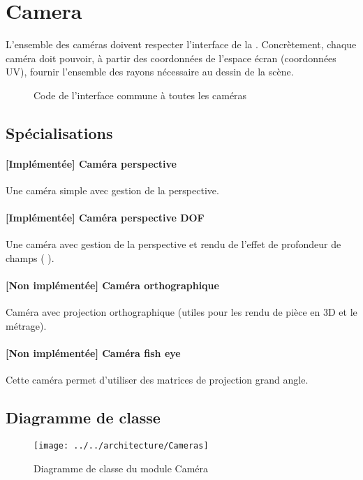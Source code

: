 \section{Camera}
L'ensemble des caméras doivent respecter l'interface de la . Concrètement, chaque caméra doit pouvoir, à partir des
coordonnées de l'espace écran (coordonnées UV), fournir l'ensemble des rayons
nécessaire au dessin de la scène.

\begin{figure}[h]
  \caption{Code de l'interface commune à toutes les
  caméras\label{fig:ICamera}}
\end{figure}

\subsection{Spécialisations}
\paragraph{[Implémentée] Caméra perspective} Une caméra simple avec gestion de
la perspective.

\paragraph{[Implémentée] Caméra perspective DOF} Une caméra avec
gestion de la perspective et rendu de l'effet de profondeur de champs (\cf
{}).

\paragraph{[Non implémentée] Caméra orthographique} Caméra avec projection
orthographique (utiles pour les rendu de pièce en 3D et le métrage).

\paragraph{[Non implémentée] Caméra fish eye} Cette caméra permet d'utiliser
des matrices de projection grand angle.

\subsection{Diagramme de classe}
\begin{figure}[h]
\begin{center}
  \texttt{[image: ../../architecture/Cameras]}
  \caption{Diagramme de classe du module Caméra\label{fig:CDCamera}}
\end{center}
\end{figure}
